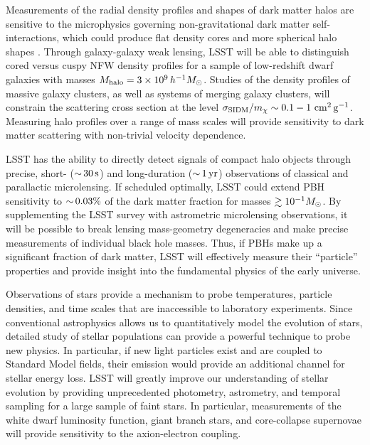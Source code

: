 \documentclass[12pt]{article}
\begin{document}
Measurements of the radial density profiles and shapes of dark matter halos are sensitive to the microphysics governing non-gravitational dark matter self-interactions, which could produce flat density cores \citep{Spergel:1999mh} and more spherical halo shapes \citep{Peter:2013}.
Through galaxy-galaxy weak lensing, LSST will be able to distinguish cored versus cuspy NFW density profiles for a sample of low-redshift dwarf galaxies with masses $M_\text{halo} = 3\times10^9\,h^{-1}M_\odot$.
Studies of the density profiles of massive galaxy clusters, as well as systems of merging galaxy clusters, will constrain the scattering cross section at the level $\sigma_{\rm SIDM}/m_\chi \sim 0.1-1 \mathrm{\,\mathrm{\,cm}^2\mathrm{\,g}^{-1}}$.
Measuring halo profiles over a range of mass scales will provide sensitivity to dark matter scattering with non-trivial velocity dependence.

LSST has the ability to directly detect signals of compact halo objects through precise, short- ($ {\sim}\, 30 \mathrm{\,s}$) and long-duration ($ {\sim}\,1 \mathrm{\,yr}$) observations of classical and parallactic microlensing\citep{1509.04899}.
If scheduled optimally, LSST could extend PBH sensitivity to $ {\sim}\,0.03\%$ of the dark matter fraction for masses $\gtrsim 10^{-1} M_\odot$.
By supplementing the LSST survey with astrometric microlensing observations, it will be possible to break lensing mass-geometry degeneracies and make precise measurements of individual black hole masses. Thus, if PBHs make up a significant fraction of dark matter, LSST will effectively measure their ``particle'' properties and provide insight into the fundamental physics of the early universe.


Observations of stars provide a mechanism to probe temperatures, particle densities, and time scales that are inaccessible to laboratory experiments. Since conventional astrophysics allows us to quantitatively model the evolution of stars, detailed study of stellar populations can provide a powerful technique to probe new physics. In particular, if new light particles exist and are coupled to Standard Model fields, their emission would provide an additional channel for stellar energy loss. 
LSST will greatly improve our understanding of stellar evolution by providing unprecedented photometry, astrometry, and temporal sampling for a large sample of faint stars. In particular, measurements of the white dwarf luminosity function, giant branch stars, and core-collapse supernovae will provide sensitivity to the axion-electron coupling.
\end{document}
